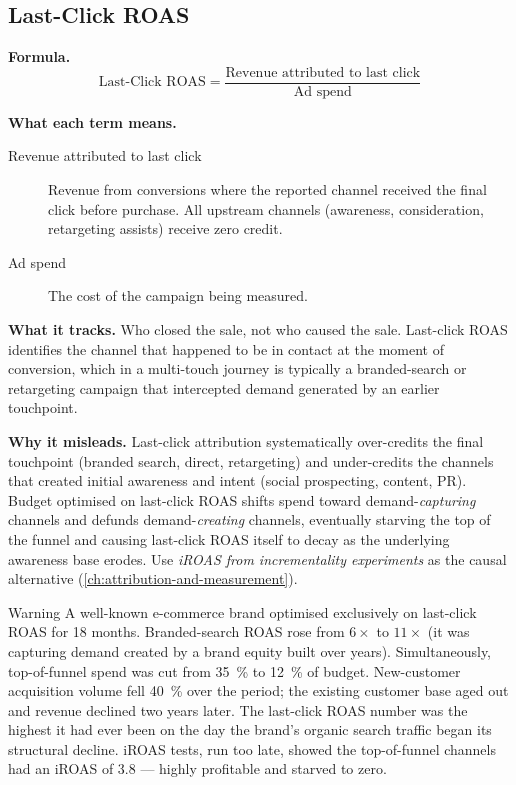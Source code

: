 \subsection{Last-Click ROAS}

\textbf{Formula.}
\[
  \text{Last-Click ROAS} = \frac{\text{Revenue attributed to last click}}{\text{Ad spend}}
\]

\textbf{What each term means.}
\begin{description}
  \item[Revenue attributed to last click] Revenue from conversions where the reported
    channel received the final click before purchase. All upstream channels (awareness,
    consideration, retargeting assists) receive zero credit.
  \item[Ad spend] The cost of the campaign being measured.
\end{description}

\textbf{What it tracks.} Who closed the sale, not who caused the sale. Last-click ROAS
identifies the channel that happened to be in contact at the moment of conversion, which in
a multi-touch journey is typically a branded-search or retargeting campaign that intercepted
demand generated by an earlier touchpoint.

\textbf{Why it misleads.} Last-click attribution systematically over-credits the final
touchpoint (branded search, direct, retargeting) and under-credits the channels that created
initial awareness and intent (social prospecting, content, PR). Budget optimised on
last-click ROAS shifts spend toward demand-\emph{capturing} channels and defunds
demand-\emph{creating} channels, eventually starving the top of the funnel and causing
last-click ROAS itself to decay as the underlying awareness base erodes. Use
\emph{iROAS from incrementality experiments} as the causal alternative
(\cref{ch:attribution-and-measurement}).

\begin{admonition}{Warning}
A well-known e-commerce brand optimised exclusively on last-click ROAS for 18 months.
Branded-search ROAS rose from $6\times$ to $11\times$ (it was capturing demand created by
a brand equity built over years). Simultaneously, top-of-funnel spend was cut from
\qty{35}{\percent} to \qty{12}{\percent} of budget. New-customer acquisition volume fell
\qty{40}{\percent} over the period; the existing customer base aged out and revenue declined
two years later. The last-click ROAS number was the highest it had ever been on the day the
brand's organic search traffic began its structural decline. iROAS tests, run too late,
showed the top-of-funnel channels had an iROAS of 3.8 --- highly profitable and starved to
zero.
\end{admonition}


